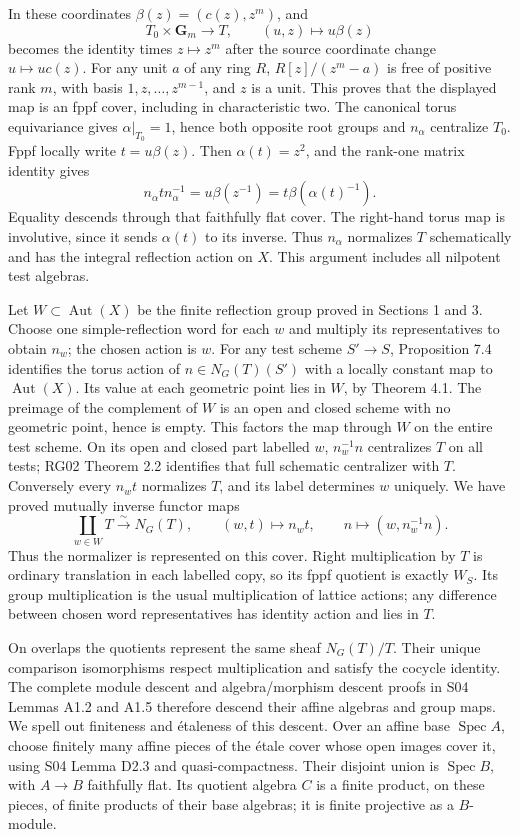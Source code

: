 \documentclass[11pt,a4paper,openany]{report}
\begin{document}
In these coordinates \(\beta(z)=(c(z),z^m)\), and \[
 T_0\times\mathbf G_m\longrightarrow T,\qquad (u,z)\longmapsto u\beta(z)
\] becomes the identity times \(z\mapsto z^m\) after the source coordinate change \(u\mapsto uc(z)\). For any unit \(a\) of any ring \(R\), \(R[z]/(z^m-a)\) is free of positive rank \(m\), with basis \(1,z,\ldots,z^{m-1}\), and \(z\) is a unit. This proves that the displayed map is an fppf cover, including in characteristic two. The canonical torus equivariance gives \(\alpha|_{T_0}=1\), hence both opposite root groups and \(n_\alpha\) centralize \(T_0\). Fppf locally write \(t=u\beta(z)\). Then \(\alpha(t)=z^2\), and the rank-one matrix identity gives \[
 n_\alpha t n_\alpha^{-1}=u\beta(z^{-1})
                         =t\beta(\alpha(t)^{-1}).
\] Equality descends through that faithfully flat cover. The right-hand torus map is involutive, since it sends \(\alpha(t)\) to its inverse. Thus \(n_\alpha\) normalizes \(T\) schematically and has the integral reflection action on \(X\). This argument includes all nilpotent test algebras.

Let \(W\subset\operatorname{Aut}(X)\) be the finite reflection group proved in Sections 1 and 3. Choose one simple-reflection word for each \(w\) and multiply its representatives to obtain \(n_w\); the chosen action is \(w\). For any test scheme \(S'\to S\), Proposition 7.4 identifies the torus action of \(n\in N_G(T)(S')\) with a locally constant map to \(\operatorname{Aut}(X)\). Its value at each geometric point lies in \(W\), by Theorem 4.1. The preimage of the complement of \(W\) is an open and closed scheme with no geometric point, hence is empty. This factors the map through \(W\) on the entire test scheme. On its open and closed part labelled \(w\), \(n_w^{-1}n\) centralizes \(T\) on all tests; RG02 Theorem 2.2 identifies that full schematic centralizer with \(T\). Conversely every \(n_wt\) normalizes \(T\), and its label determines \(w\) uniquely. We have proved mutually inverse functor maps \[
 \coprod_{w\in W}T\xrightarrow{\sim}N_G(T),
 \qquad (w,t)\longmapsto n_wt,
 \qquad n\longmapsto(w,n_w^{-1}n).
\] Thus the normalizer is represented on this cover. Right multiplication by \(T\) is ordinary translation in each labelled copy, so its fppf quotient is exactly \(W_S\). Its group multiplication is the usual multiplication of lattice actions; any difference between chosen word representatives has identity action and lies in \(T\).

On overlaps the quotients represent the same sheaf \(N_G(T)/T\). Their unique comparison isomorphisms respect multiplication and satisfy the cocycle identity. The complete module descent and algebra/morphism descent proofs in S04 Lemmas A1.2 and A1.5 therefore descend their affine algebras and group maps. We spell out finiteness and étaleness of this descent. Over an affine base \(\operatorname{Spec}A\), choose finitely many affine pieces of the étale cover whose open images cover it, using S04 Lemma D2.3 and quasi-compactness. Their disjoint union is \(\operatorname{Spec}B\), with \(A\to B\) faithfully flat. Its quotient algebra \(C\) is a finite product, on these pieces, of finite products of their base algebras; it is finite projective as a \(B\)-module.
\end{document}
